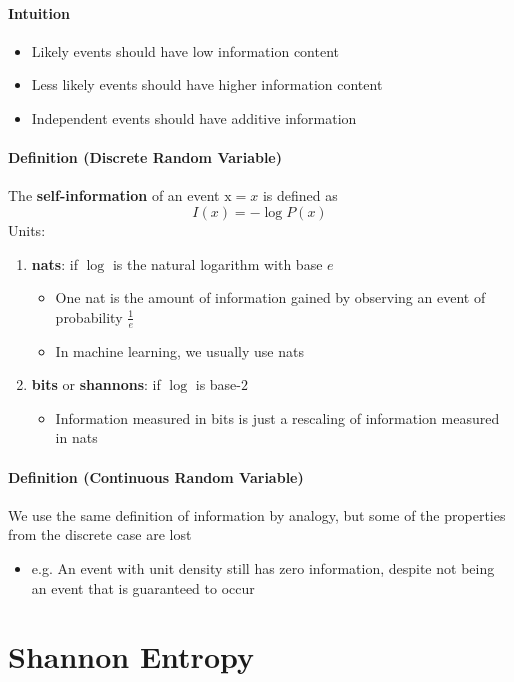 \documentclass[12pt, a4paper]{article}
\begin{document}
\paragraph{Intuition}
\begin{itemize}
    \item Likely events should have low information content
    \item Less likely events should have higher information content
    \item Independent events should have additive information
\end{itemize}

\paragraph{Definition (Discrete Random Variable)} 
The \textbf{self-information} of an event $\mathrm{x}=x$ is defined as
\[
    I(x) = - \log P(x)
\]
Units:
\begin{enumerate}
    \item \textbf{nats}: if $\log$ is the natural logarithm with base $e$
        \begin{itemize}
            \item One nat is the amount of information gained by observing an event of probability $\frac{1}{e}$
            \item In machine learning, we usually use nats
        \end{itemize}
    \item \textbf{bits} or \textbf{shannons}: if $\log$ is base-$2$
        \begin{itemize}
            \item Information measured in bits is just a rescaling of information measured in nats
        \end{itemize}
\end{enumerate}
\paragraph{Definition (Continuous Random Variable)} 
We use the same definition of information by analogy, but some of the properties from the discrete case are lost
\begin{itemize}
    \item e.g. An event with unit density still has zero information, despite not being an event that is guaranteed to occur
\end{itemize}


\section{Shannon Entropy}
\end{document}
